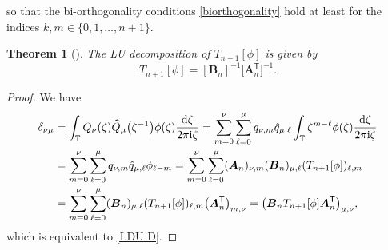 \documentclass[pdftex]{sigma}
\numberwithin{equation}{section}
\newtheorem{Theorem}{Theorem}[section]
\newcommand{\T}{{\mathbb T}}
\newcommand{\ze}{\zeta}
\newcommand{\ii}{{\rm i}}
\newcommand{\dd}{{\rm d}}
\begin{document}
		so that the bi-orthogonality conditions \eqref{biorthogonality} hold at least for the indices $k,m \in \{0,1,\dots,n+1\}$.
		\begin{Theorem}[\cite{GW}]
			The LU decomposition of $T_{n+1}[\phi]$ is given by
			\begin{equation}\label{LDU D}
				T_{n+1}[\phi] = [\boldsymbol{B}_{n}]^{-1} 	 \big[\boldsymbol{A}_{n}^{\mathsf T}\big]^{-1}.
			\end{equation}
		\end{Theorem}
		\begin{proof}
			We have
			\begin{align*}
					\delta_{\nu \mu} & = \int_{\T} Q_{\nu}(\ze) \widehat{Q}_{\mu}\big(\ze^{-1}\big) \phi(\ze) \frac{\dd \ze}{2\pi \ii \ze} = \sum_{m=0}^{\nu} \sum_{\ell=0}^{\mu} q_{\nu,m}\hat{q}_{\mu,\ell} \int_{\T} \ze^{m-\ell} \phi(\ze) \frac{\dd \ze}{2\pi \ii \ze} \\
&
					= \sum_{m=0}^{\nu} \sum_{\ell=0}^{\mu} q_{\nu,m}\hat{q}_{\mu,\ell} \phi_{\ell-m} = \sum_{m=0}^{\nu} \sum_{\ell=0}^{\mu} ( \boldsymbol{A}_{n} )_{\nu,m} ( \boldsymbol{B}_{n} )_{\mu,\ell} ( T_{n+1}[\phi] )_{\ell,m} \\
& = \sum_{m=0}^{\nu} \sum_{\ell=0}^{\mu} ( \boldsymbol{B}_{n} )_{\mu,\ell} ( T_{n+1}[\phi] )_{\ell,m} \big( \boldsymbol{A}_{n}^{\mathsf T} \big)_{m,\nu} = \big( \boldsymbol{B}_{n} T_{n+1}[\phi] \boldsymbol{A}_{n}^{\mathsf T} \big)_{\mu,\nu},
			\end{align*}
			which is equivalent to \eqref{LDU D}.
		\end{proof}
\end{document}
